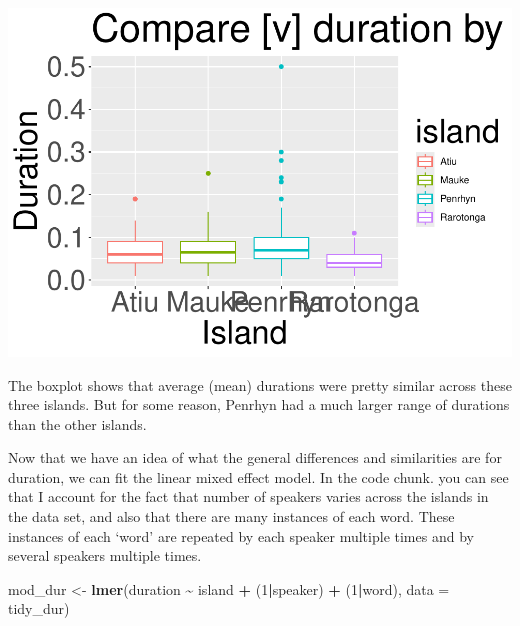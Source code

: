 \documentclass[
  ,man,floatsintext]{apa6}
\newenvironment{Shaded}{\begin{snugshade}}{\end{snugshade}}
\newcommand{\AttributeTok}[1]{\textcolor[rgb]{0.13,0.29,0.53}{#1}}
\newcommand{\DecValTok}[1]{\textcolor[rgb]{0.00,0.00,0.81}{#1}}
\newcommand{\FunctionTok}[1]{\textcolor[rgb]{0.13,0.29,0.53}{\textbf{#1}}}
\newcommand{\NormalTok}[1]{#1}
\newcommand{\OtherTok}[1]{\textcolor[rgb]{0.56,0.35,0.01}{#1}}
\newcommand{\SpecialCharTok}[1]{\textcolor[rgb]{0.81,0.36,0.00}{\textbf{#1}}}
\begin{document}
\includegraphics{D2_CIM_files/figure-latex/print-duration-plot-1.pdf}

The boxplot shows that average (mean) durations were pretty similar across these three islands. But for some reason, Penrhyn had a much larger range of durations than the other islands.

Now that we have an idea of what the general differences and similarities are for duration, we can fit the linear mixed effect model. In the code chunk. you can see that I account for the fact that number of speakers varies across the islands in the data set, and also that there are many instances of each word. These instances of each `word' are repeated by each speaker multiple times and by several speakers multiple times.

\begin{Shaded}
\begin{Highlighting}[]
\NormalTok{mod\_dur }\OtherTok{\textless{}{-}} \FunctionTok{lmer}\NormalTok{(duration }\SpecialCharTok{\textasciitilde{}}\NormalTok{ island }\SpecialCharTok{+}\NormalTok{ (}\DecValTok{1}\SpecialCharTok{|}\NormalTok{speaker) }\SpecialCharTok{+}\NormalTok{ (}\DecValTok{1}\SpecialCharTok{|}\NormalTok{word), }\AttributeTok{data =}\NormalTok{ tidy\_dur)}
\end{Highlighting}
\end{Shaded}
\end{document}
